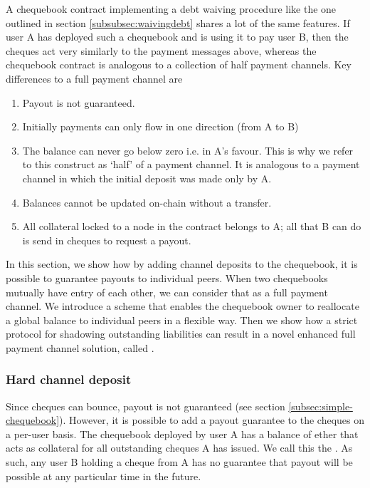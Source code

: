 A chequebook contract implementing a debt waiving procedure like the one outlined in section \ref{subsubsec:waivingdebt} shares a lot of the same features. If user A has deployed such a chequebook and is using it to pay user B, then the cheques act very similarly to the payment messages above, whereas the chequebook contract is analogous to a collection of half payment channels. Key differences to a full payment channel are 

\begin{enumerate}
    \item Payout is not guaranteed. 
    \item Initially payments can only flow in one direction (from A to B) 
    \item The balance can never go below zero i.e. in A's favour. This is why we refer to this construct as `half' of a payment channel. It is analogous to a payment channel in which the initial deposit was made only by A.
    \item Balances cannot be updated on-chain without a transfer. 
    \item All collateral locked to a node in the contract belongs to A; all that B can do is send in cheques to request a payout.%
\end{enumerate}

In this section, we show how by adding channel deposits to the chequebook, it is possible to guarantee payouts to individual peers. When two chequebooks mutually have entry of each other, we can consider that as a full payment channel. We introduce a scheme that enables the chequebook owner to reallocate a global balance to individual peers in  a flexible way. Then we show how a strict protocol for shadowing outstanding liabilities can result in a novel enhanced full payment channel solution, called .

\subsubsection{Hard channel deposit}\label{subsubsec:per-user-guarantees}


Since cheques can bounce, payout is not guaranteed (see section \ref{subsec:simple-chequebook}). However, it is possible to add a payout guarantee to the cheques on a per-user basis. The chequebook deployed by user A has a balance of ether that acts as collateral for all outstanding cheques A has issued. We call this the . As such, any user B holding a cheque from A has no guarantee that payout will be possible at any particular time in the future. 

